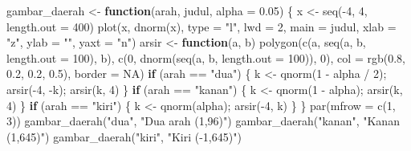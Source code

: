 \documentclass[
  indonesian,
  letterpaper,
]{book}
\newenvironment{Shaded}{\begin{snugshade}}{\end{snugshade}}
\newcommand{\AttributeTok}[1]{\textcolor[rgb]{0.40,0.45,0.13}{#1}}
\newcommand{\ConstantTok}[1]{\textcolor[rgb]{0.56,0.35,0.01}{#1}}
\newcommand{\ControlFlowTok}[1]{\textcolor[rgb]{0.00,0.23,0.31}{\textbf{#1}}}
\newcommand{\DecValTok}[1]{\textcolor[rgb]{0.68,0.00,0.00}{#1}}
\newcommand{\FloatTok}[1]{\textcolor[rgb]{0.68,0.00,0.00}{#1}}
\newcommand{\FunctionTok}[1]{\textcolor[rgb]{0.28,0.35,0.67}{#1}}
\newcommand{\NormalTok}[1]{\textcolor[rgb]{0.00,0.23,0.31}{#1}}
\newcommand{\OtherTok}[1]{\textcolor[rgb]{0.00,0.23,0.31}{#1}}
\newcommand{\SpecialCharTok}[1]{\textcolor[rgb]{0.37,0.37,0.37}{#1}}
\newcommand{\StringTok}[1]{\textcolor[rgb]{0.13,0.47,0.30}{#1}}
\begin{document}
\begin{Shaded}
\begin{Highlighting}[]
\NormalTok{gambar\_daerah }\OtherTok{\textless{}{-}} \ControlFlowTok{function}\NormalTok{(arah, judul, }\AttributeTok{alpha =} \FloatTok{0.05}\NormalTok{) \{}
\NormalTok{  x }\OtherTok{\textless{}{-}} \FunctionTok{seq}\NormalTok{(}\SpecialCharTok{{-}}\DecValTok{4}\NormalTok{, }\DecValTok{4}\NormalTok{, }\AttributeTok{length.out =} \DecValTok{400}\NormalTok{)}
  \FunctionTok{plot}\NormalTok{(x, }\FunctionTok{dnorm}\NormalTok{(x), }\AttributeTok{type =} \StringTok{"l"}\NormalTok{, }\AttributeTok{lwd =} \DecValTok{2}\NormalTok{, }\AttributeTok{main =}\NormalTok{ judul, }\AttributeTok{xlab =} \StringTok{"z"}\NormalTok{, }\AttributeTok{ylab =} \StringTok{""}\NormalTok{, }\AttributeTok{yaxt =} \StringTok{"n"}\NormalTok{)}
\NormalTok{  arsir }\OtherTok{\textless{}{-}} \ControlFlowTok{function}\NormalTok{(a, b) }\FunctionTok{polygon}\NormalTok{(}\FunctionTok{c}\NormalTok{(a, }\FunctionTok{seq}\NormalTok{(a, b, }\AttributeTok{length.out =} \DecValTok{100}\NormalTok{), b),}
                                  \FunctionTok{c}\NormalTok{(}\DecValTok{0}\NormalTok{, }\FunctionTok{dnorm}\NormalTok{(}\FunctionTok{seq}\NormalTok{(a, b, }\AttributeTok{length.out =} \DecValTok{100}\NormalTok{)), }\DecValTok{0}\NormalTok{),}
                                  \AttributeTok{col =} \FunctionTok{rgb}\NormalTok{(}\FloatTok{0.8}\NormalTok{, }\FloatTok{0.2}\NormalTok{, }\FloatTok{0.2}\NormalTok{, }\FloatTok{0.5}\NormalTok{), }\AttributeTok{border =} \ConstantTok{NA}\NormalTok{)}
  \ControlFlowTok{if}\NormalTok{ (arah }\SpecialCharTok{==} \StringTok{"dua"}\NormalTok{)   \{ k }\OtherTok{\textless{}{-}} \FunctionTok{qnorm}\NormalTok{(}\DecValTok{1} \SpecialCharTok{{-}}\NormalTok{ alpha }\SpecialCharTok{/} \DecValTok{2}\NormalTok{); }\FunctionTok{arsir}\NormalTok{(}\SpecialCharTok{{-}}\DecValTok{4}\NormalTok{, }\SpecialCharTok{{-}}\NormalTok{k); }\FunctionTok{arsir}\NormalTok{(k, }\DecValTok{4}\NormalTok{) \}}
  \ControlFlowTok{if}\NormalTok{ (arah }\SpecialCharTok{==} \StringTok{"kanan"}\NormalTok{) \{ k }\OtherTok{\textless{}{-}} \FunctionTok{qnorm}\NormalTok{(}\DecValTok{1} \SpecialCharTok{{-}}\NormalTok{ alpha); }\FunctionTok{arsir}\NormalTok{(k, }\DecValTok{4}\NormalTok{) \}}
  \ControlFlowTok{if}\NormalTok{ (arah }\SpecialCharTok{==} \StringTok{"kiri"}\NormalTok{)  \{ k }\OtherTok{\textless{}{-}} \FunctionTok{qnorm}\NormalTok{(alpha); }\FunctionTok{arsir}\NormalTok{(}\SpecialCharTok{{-}}\DecValTok{4}\NormalTok{, k) \}}
\NormalTok{\}}
\FunctionTok{par}\NormalTok{(}\AttributeTok{mfrow =} \FunctionTok{c}\NormalTok{(}\DecValTok{1}\NormalTok{, }\DecValTok{3}\NormalTok{))}
\FunctionTok{gambar\_daerah}\NormalTok{(}\StringTok{"dua"}\NormalTok{,   }\StringTok{"Dua arah (1,96)"}\NormalTok{)}
\FunctionTok{gambar\_daerah}\NormalTok{(}\StringTok{"kanan"}\NormalTok{, }\StringTok{"Kanan (1,645)"}\NormalTok{)}
\FunctionTok{gambar\_daerah}\NormalTok{(}\StringTok{"kiri"}\NormalTok{,  }\StringTok{"Kiri ({-}1,645)"}\NormalTok{)}
\end{Highlighting}
\end{Shaded}
\end{document}
